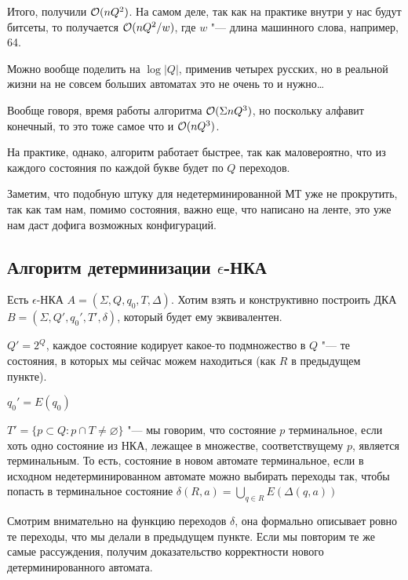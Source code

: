 Итого, получили $\mathcal{O}(nQ^2)$. На самом деле, так как на практике внутри у нас будут битсеты, то получается $\mathcal{O}(nQ^2/w)$, где $w$ "--- длина машинного слова, например, 64.

Можно вообще поделить на $\log |Q|$, применив четырех русских, но в реальной жизни на не совсем больших автоматах это не очень то и нужно\dots

\begin{Rem}
Вообще говоря, время работы алгоритма $\mathcal{O}(\Sigma nQ^3)$, но поскольку алфавит конечный, то это тоже самое что и $\mathcal{O}(nQ^3)$.
\end{Rem}

\begin{Rem}
На практике, однако, алгоритм работает быстрее, так как маловероятно, что из каждого состояния по каждой букве будет по $Q$ переходов.
\end{Rem}

\begin{Rem}
Заметим, что подобную штуку для недетерминированной МТ уже не прокрутить, так как там нам, помимо состояния, важно еще, что написано на ленте, это уже нам даст дофига возможных конфигураций.
\end{Rem}


\subsection{Алгоритм детерминизации \texorpdfstring{$\epsilon$}{epsilon}-НКА}
Есть $\epsilon$-НКА $A = (\Sigma, Q, q_0, T, \Delta)$. 
Хотим взять и конструктивно построить ДКА $B = (\Sigma, Q', q_0', T', \delta)$, который будет ему эквивалентен.

$Q' = 2^Q$, каждое состояние кодирует какое-то подмножество в $Q$ "--- те состояния, в которых мы сейчас можем находиться (как $R$ в предыдущем пункте).

$q_0' = E(q_0)$

$T' = \{p \subset Q: p \cap T \neq \varnothing\}$ "--- мы говорим, что состояние $p$ терминальное, если хоть одно состояние из НКА, лежащее в множестве, соответствущему $p$, является терминальным.
То есть, состояние в новом автомате терминальное, если в исходном недетерминированном автомате можно выбирать переходы так, чтобы попасть в терминальное состояние
$\delta(R, a) = \bigcup\limits_{q \in R} E(\Delta(q, a))$

Смотрим внимательно на функцию переходов $\delta$, она формально описывает ровно те переходы, что мы делали в предыдущем пункте.
Если мы повторим те же самые рассуждения, получим доказательство корректности нового детерминированного автомата.


